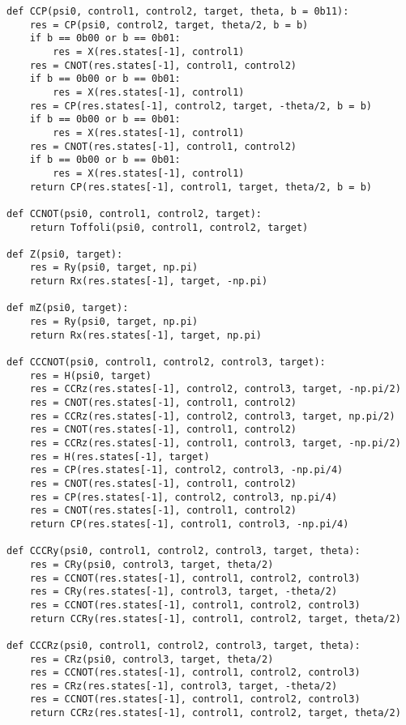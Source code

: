 \begin{verbatim}
def CCP(psi0, control1, control2, target, theta, b = 0b11):
    res = CP(psi0, control2, target, theta/2, b = b)
    if b == 0b00 or b == 0b01:
        res = X(res.states[-1], control1)
    res = CNOT(res.states[-1], control1, control2)
    if b == 0b00 or b == 0b01:
        res = X(res.states[-1], control1)
    res = CP(res.states[-1], control2, target, -theta/2, b = b)
    if b == 0b00 or b == 0b01:
        res = X(res.states[-1], control1)
    res = CNOT(res.states[-1], control1, control2)
    if b == 0b00 or b == 0b01:
        res = X(res.states[-1], control1)
    return CP(res.states[-1], control1, target, theta/2, b = b)

def CCNOT(psi0, control1, control2, target):
    return Toffoli(psi0, control1, control2, target)

def Z(psi0, target):
    res = Ry(psi0, target, np.pi)
    return Rx(res.states[-1], target, -np.pi)

def mZ(psi0, target):
    res = Ry(psi0, target, np.pi)
    return Rx(res.states[-1], target, np.pi)

def CCCNOT(psi0, control1, control2, control3, target):
    res = H(psi0, target)
    res = CCRz(res.states[-1], control2, control3, target, -np.pi/2)
    res = CNOT(res.states[-1], control1, control2)
    res = CCRz(res.states[-1], control2, control3, target, np.pi/2)
    res = CNOT(res.states[-1], control1, control2)
    res = CCRz(res.states[-1], control1, control3, target, -np.pi/2)
    res = H(res.states[-1], target)
    res = CP(res.states[-1], control2, control3, -np.pi/4)
    res = CNOT(res.states[-1], control1, control2)
    res = CP(res.states[-1], control2, control3, np.pi/4)
    res = CNOT(res.states[-1], control1, control2)
    return CP(res.states[-1], control1, control3, -np.pi/4)

def CCCRy(psi0, control1, control2, control3, target, theta):
    res = CRy(psi0, control3, target, theta/2)
    res = CCNOT(res.states[-1], control1, control2, control3)
    res = CRy(res.states[-1], control3, target, -theta/2)
    res = CCNOT(res.states[-1], control1, control2, control3)
    return CCRy(res.states[-1], control1, control2, target, theta/2)

def CCCRz(psi0, control1, control2, control3, target, theta):
    res = CRz(psi0, control3, target, theta/2)
    res = CCNOT(res.states[-1], control1, control2, control3)
    res = CRz(res.states[-1], control3, target, -theta/2)
    res = CCNOT(res.states[-1], control1, control2, control3)
    return CCRz(res.states[-1], control1, control2, target, theta/2)


\end{verbatim}
